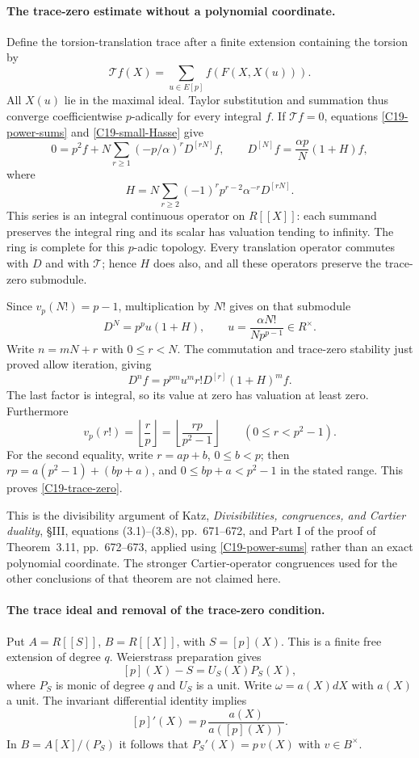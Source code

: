 \documentclass[11pt]{article}
\theoremstyle{definition}\newtheorem{definition}[theorem]{Definition}\newtheorem{remark}[theorem]{Remark}
\begin{document}
\paragraph{The trace-zero estimate without a polynomial coordinate.}
Define the torsion-translation trace after a finite extension
containing the torsion by
\[
 \mathcal T f(X)=\sum_{u\in E[p]}f(F(X,X(u))).
\]
All $X(u)$ lie in the maximal ideal.  Taylor substitution and
summation thus converge coefficientwise $p$-adically for every
integral $f$.  If $\mathcal T f=0$, equations
\eqref{C19-power-sums} and \eqref{C19-small-Hasse} give
\[
 0=p^2f+N\sum_{r\geq1}(-p/\alpha)^rD^{[rN]}f,
 \qquad
 D^{[N]}f=\frac{\alpha p}{N}(1+H)f,
\]
where
\begin{equation}\label{C19-H}
 H=N\sum_{r\geq2}(-1)^r p^{r-2}\alpha^{-r}D^{[rN]}.
\end{equation}
This series is an integral continuous operator on $R[[X]]$:
each summand preserves the integral ring and its scalar has
valuation tending to infinity.  The ring is complete for this
$p$-adic topology.  Every translation operator commutes with
$D$ and with $\mathcal T$; hence $H$ does also, and all these
operators preserve the trace-zero submodule.

Since $v_p(N!)=p-1$, multiplication by $N!$ gives on that
submodule
\[
 D^N=p^p u(1+H),\qquad
 u=\frac{\alpha N!}{Np^{p-1}}\in R^\times.
\]
Write $n=mN+r$ with $0\leq r<N$.  The commutation and
trace-zero stability just proved allow iteration, giving
\[
 D^nf=p^{pm}u^m r!D^{[r]}(1+H)^m f.
\]
The last factor is integral, so its value at zero has valuation
at least zero.  Furthermore
\[
 v_p(r!)=\left\lfloor\frac rp\right\rfloor
        =\left\lfloor\frac{rp}{p^2-1}\right\rfloor
          \qquad(0\leq r<p^2-1).
\]
For the second equality, write $r=ap+b$, $0\leq b<p$;
then $rp=a(p^2-1)+(bp+a)$, and
$0\leq bp+a<p^2-1$ in the stated range.
This proves \eqref{C19-trace-zero}.

This is the divisibility argument of Katz,
\emph{Divisibilities, congruences, and Cartier duality},
\S III, equations (3.1)--(3.8), pp.~671--672, and Part I of
the proof of Theorem~3.11, pp.~672--673, applied using
\eqref{C19-power-sums} rather than an exact polynomial
coordinate.  The stronger Cartier-operator congruences used
for the other conclusions of that theorem are not claimed here.

\paragraph{The trace ideal and removal of the trace-zero condition.}
Put $A=R[[S]]$, $B=R[[X]]$, with $S=[p](X)$.
This is a finite free extension of degree $q$.
Weierstrass preparation gives
\[
 [p](X)-S=U_S(X)P_S(X),
\]
where $P_S$ is monic of degree $q$ and $U_S$ is a unit.
Write $\omega=a(X)dX$ with $a(X)$ a unit.
The invariant differential identity implies
\[
 [p]'(X)=p\,\frac{a(X)}{a([p](X))}.
\]
In $B=A[X]/(P_S)$ it follows that
$P_S'(X)=p\,v(X)$ with $v\in B^\times$.
\end{document}
